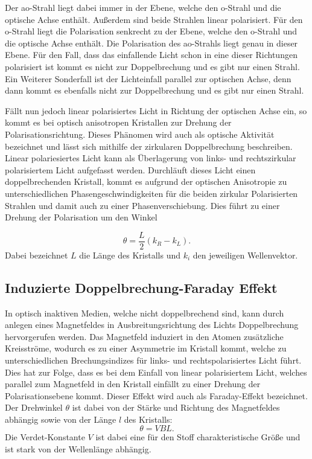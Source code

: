 Der ao-Strahl liegt dabei immer in der Ebene, welche den o-Strahl und die
optische Achse enthält. Außerdem sind beide Strahlen linear polarisiert.
Für den o-Strahl liegt die Polarisation senkrecht zu der Ebene, welche den o-Strahl und die
optische Achse enthält. Die Polarisation des ao-Strahls liegt genau in dieser Ebene.
Für den Fall, dass das einfallende Licht schon in eine dieser Richtungen polarisiert ist
kommt es nicht zur Doppelbrechung und es gibt nur einen Strahl.
Ein Weiterer Sonderfall ist der Lichteinfall parallel zur optischen Achse, denn dann
kommt es ebenfalls nicht zur Doppelbrechung und es gibt nur einen Strahl.


Fällt nun jedoch linear polarisiertes Licht in Richtung der optischen Achse ein, so kommt es
bei optisch anisotropen Kristallen zur Drehung der Polarisationsrichtung. Dieses Phänomen wird
auch als optische Aktivität bezeichnet und lässt sich mithilfe der zirkularen Doppelbrechung
beschreiben.
Linear polariesiertes Licht kann als Überlagerung von links- und rechtszirkular
polarisiertem Licht aufgefasst werden. Durchläuft dieses Licht einen doppelbrechenden Kristall, kommt
es aufgrund der optischen Anisotropie zu unterschiedlichen Phasengeschwindigkeiten für die beiden zirkular
Polarisierten Strahlen und damit auch zu einer Phasenverschiebung. Dies führt
zu einer Drehung der Polarisation um den Winkel

\begin{equation}
  \theta=\frac{L}{2}(k_R -k_L).
\end{equation}
Dabei bezeichnet $L$ die Länge des Kristalls und $k_i$ den jeweiligen Wellenvektor.



\subsection{Induzierte Doppelbrechung-Faraday Effekt}
In optisch inaktiven Medien, welche nicht doppelbrechend sind, kann durch anlegen eines Magnetfeldes in Ausbreitungsrichtung des Lichts
Doppelbrechung hervorgerufen werden. Das Magnetfeld induziert in den Atomen zusätzliche Kreisströme, wodurch es zu einer Asymmetrie im
Kristall kommt, welche zu unterschiedlichen Brechungsindizes für links- und rechtspolarisiertes Licht führt. Dies hat zur Folge, dass es
bei dem Einfall von linear polarisiertem Licht, welches parallel zum Magnetfeld in den Kristall einfällt zu einer Drehung der
Polarisationsebene kommt. Dieser Effekt wird auch als Faraday-Effekt bezeichnet.
Der Drehwinkel $\theta$ ist dabei von der Stärke und Richtung des Magnetfeldes abhängig sowie von der Länge $l$ des Kristalls:
\begin{equation}
  \theta=VBL.
\end{equation}
Die Verdet-Konstante $V$ ist dabei eine für den Stoff charakteristische Größe und ist stark von der Wellenlänge abhängig.

